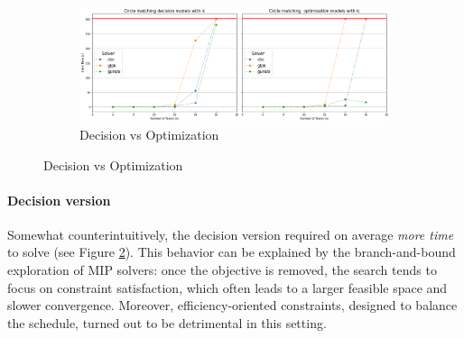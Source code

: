 \begin{figure}[H]
    \centering
    \begin{subfigure}{\linewidth}
        \centering
        \includegraphics[width=\linewidth]{imgs/plot1.png}
        \caption{Decision vs Optimization}
        \label{fig:mip1}
    \end{subfigure}
\end{figure}

\paragraph{Decision version}
Somewhat counterintuitively, the decision version required on average \emph{more time} to solve (see Figure \ref{fig:mip1}). 
This behavior can be explained by the branch-and-bound exploration of MIP solvers: once the objective is removed, the search tends to focus on constraint satisfaction, which often leads to a larger feasible space and slower convergence.
Moreover, efficiency-oriented constraints, designed to balance the schedule, turned out to be detrimental in this setting.


